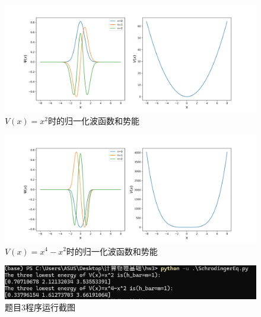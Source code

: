 \documentclass[11pt]{article}
\begin{document}
 
  \begin{figure}[ht]
    \centering
    \includegraphics[width=0.8\linewidth]{photo/wavefunction of V=x^2.png}
    \caption{$V(x)=x^2$时的归一化波函数和势能}
    \label{fig:4}
  \end{figure}

  \begin{figure}[ht]
    \centering
    \includegraphics[width=0.8\linewidth]{photo/wavefunction of V=x^4-x^2.png}
    \caption{$V(x)=x^4-x^2$时的归一化波函数和势能}
    \label{fig:5}
  \end{figure}

  \begin{figure}
    \centering
    \includegraphics[width=0.6\linewidth]{photo/fig4.png}
    \caption{题目3程序运行截图}
    \label{fig:6}
  \end{figure}

  
\end{document}
